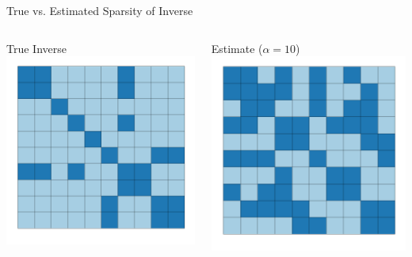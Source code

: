 \documentclass{beamer}
\begin{document}
\begin{frame}{True vs. Estimated Sparsity of Inverse}
\vfill
\begin{columns}
	\begin{column}{0.5\textwidth}
		\begin{center}
			True Inverse
			\includegraphics[width=\textwidth]{figs/sparse_cov_true.pdf}
		\end{center}
	\end{column}
	\begin{column}{0.5\textwidth}
		\begin{center}
			Estimate ($\alpha = 10$)
			\includegraphics[width=\textwidth]{figs/sparse_cov_alpha10.pdf}
		\end{center}
	\end{column}
\end{columns}
\vfill
\end{frame}
\end{document}
